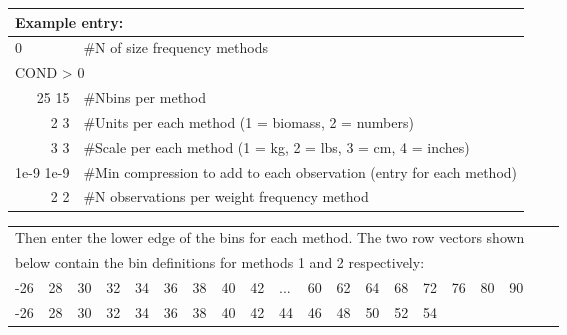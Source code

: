 \begin{center}
	\begin{tabular}{p{1.4cm} p{0.5cm} p{13 cm}}
		\multicolumn{3}{l}{Example entry:}\\
		\hline
		0 &  & \#N of size frequency methods\\
		\hline
		\multicolumn{3}{l}{COND > 0 }  \\
		\multicolumn{2}{r}{25 15} & \#Nbins per method\\
		\multicolumn{2}{r}{2 3} & \#Units per each method (1 = biomass, 2 = numbers)\\
		\multicolumn{2}{r}{3 3} & \#Scale per each method (1 = kg, 2 = lbs, 3 = cm, 4 = inches)\\
		\multicolumn{2}{r}{1e-9 1e-9} & \#Min compression to add to each observation (entry for each method)\\
		\multicolumn{2}{r}{2 2} & \#N observations per weight frequency method \\
		\hline
	\end{tabular}
\end{center}

\begin{center}
	\begin{tabular}{p{0.4cm} p{0.4cm} p{0.4cm} p{0.4cm} p{0.4cm} p{0.4cm} p{0.5cm} p{0.5cm} p{0.5cm} p{0.5cm} p{0.5cm} p{0.5cm} p{0.5cm} p{0.5cm} p{0.5cm} p{0.5cm} p{0.5cm} p{0.5cm} p{0.5cm} p{0.25cm}}
		\multicolumn{18}{l}{Then enter the lower edge of the bins for each method. The two row vectors shown}\\
		\multicolumn{18}{l}{below contain the bin definitions for methods 1 and 2 respectively:}\\
		\hline
		-26 & 28 & 30 & 32 & 34 & 36 & 38 & 40 & 42 & ... & 60 & 62 & 64 & 68 & 72 & 76 & 80 & 90\\
		-26 & 28 & 30 & 32 & 34 & 36 & 38 & 40 & 42 &  44 & 46 & 48 & 50 & 52 & \multicolumn{4}{l}{54} \\
		\hline 
	\end{tabular}
\end{center}

